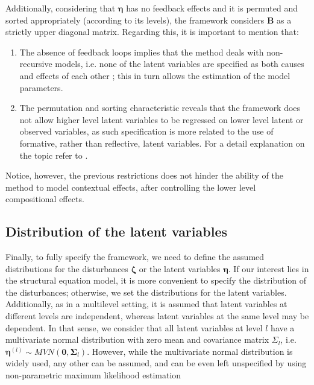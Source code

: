 Additionally, considering that $\pmb{\eta}$ has no feedback effects and it is permuted and sorted appropriately (according to its levels), the framework considers $\mathbf{B}$ as a strictly upper diagonal matrix. Regarding this, it is important to mention that: 
\begin{enumerate}
	\item The absence of feedback loops implies that the method deals with non-recursive models, i.e. none of the latent variables are specified as both causes and effects of each other \citep{Kline_2012}; {\color{red} this in turn allows the estimation of the model parameters}.
	
	\item The permutation and sorting characteristic reveals that the framework does not allow higher level latent variables to be regressed on lower level latent or observed variables, as such specification is more related to the use of formative, rather than reflective, latent variables. For a detail explanation on the topic refer to \citet{Edwards_et_al_2000}.
\end{enumerate}
Notice, however, the previous restrictions does not hinder the ability of the method to model contextual effects, after controlling the lower level compositional effects.





\subsection{Distribution of the latent variables}
Finally, to fully specify the framework, we need to define the assumed distributions for the disturbances $\pmb{\zeta}$ or the latent variables $\pmb{\eta}$. If our interest lies in the structural equation model, it is more convenient to specify the distribution of the disturbances; otherwise, we set the distributions for the latent variables. Additionally, as in a multilevel setting, it is assumed that latent variables at different levels are independent, whereas latent variables at the same level may be dependent. In that sense, we consider that all latent variables at level $l$ have a multivariate normal distribution with zero mean and covariance matrix $\Sigma_{l}$, i.e. $\pmb{\eta}^{(l)} \sim MVN(\mathbf{0}, \pmb{\Sigma}_{l})$. However, while the multivariate normal distribution is widely used, any other can be assumed, and can be even left unspecified by using non-parametric maximum likelihood estimation \citep{Rabe_et_al_2003a}



